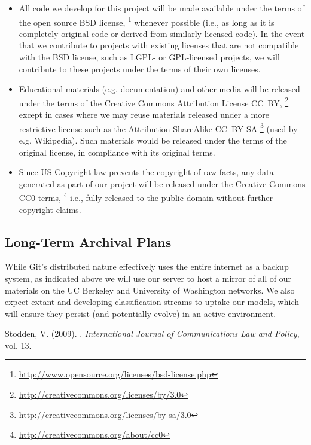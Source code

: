\documentclass[11pt]{article}
\begin{document}
\begin{itemize}

\item All code we develop for this project will be made available under the
terms of the open source BSD license,
\footnote{\url{http://www.opensource.org/licenses/bsd-license.php} } whenever
possible (i.e., as long as it is completely original code or derived from
similarly licensed code).  In the event that we contribute to projects with
existing licenses that are not compatible with the BSD license, such as LGPL- or
GPL-licensed projects, we will contribute to these projects under the terms of
their own licenses.

\item Educational materials (e.g. documentation) and other media will be
released under the terms of the Creative Commons Attribution License CC~BY,
\footnote{\url{http://creativecommons.org/licenses/by/3.0} } except in cases
where we may reuse materials released under a more restrictive license such as
the Attribution-ShareAlike CC~BY-SA
\footnote{\url{http://creativecommons.org/licenses/by-sa/3.0} } (used by e.g.
Wikipedia). Such materials would be released under the terms of the original
license, in compliance with its original terms.

\item Since US Copyright law prevents the copyright of raw facts, any data
generated as part of our project will be released under the Creative Commons CC0
terms, \footnote{\url{http://creativecommons.org/about/cc0} } i.e., fully
released to the public domain without further copyright claims.

\end{itemize}

\subsection*{Long-Term Archival Plans}

While Git's distributed nature effectively uses the entire internet as a backup
system, as indicated above we will use our server to host a mirror of all of our
materials on the UC Berkeley and University of Washington networks.  We also
expect extant and developing classification streams to uptake our models, which
will ensure they persist (and potentially evolve) in an active environment.

\begin{thebibliography}{99}

 Stodden, V. (2009). . \newblock
{\textit{International Journal of Communications Law and Policy}, vol. 13}.

\end{thebibliography}
\end{document}
